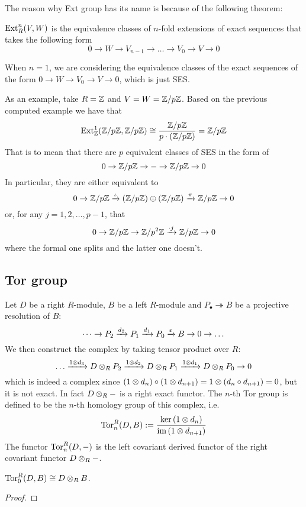 \begin{re}
    The reason why Ext group has its name is because of the following theorem:

    \medskip

    \begin{thm}
        $\operatorname{Ext}^n_R(V,W)$ is the equivalence classes of $n$-fold extensions of exact sequences that takes the following form 
        \[0 \to W \to V_{n-1}\to \dots \to V_0 \to V \to 0\]
    \end{thm}

    When $n=1$, we are considering the equivalence classes of the exact sequences of the form $0\to W \to V_0 \to V \to 0$, which is just SES.

    As an example, take $R={\mathbb Z}$ and $V=W = {\mathbb Z}/p{\mathbb Z}$. Based on the previous computed example we have that 
    \[\operatorname{Ext}_{\mathbb Z}^1({\mathbb Z}/p{\mathbb Z}, {\mathbb Z}/p{\mathbb Z}) \cong \frac{{\mathbb Z}/p{\mathbb Z}}{p\cdot ({\mathbb Z}/p{\mathbb Z})} = {\mathbb Z}/p{\mathbb Z}\]
    That is to mean that there are $p$ equivalent classes of SES in the form of 
    \[0 \to {\mathbb Z}/p{\mathbb Z} \to - \to {\mathbb Z}/p{\mathbb Z} \to 0\]
    In particular, they are either equivalent to 
    \[0 \to {\mathbb Z}/p{\mathbb Z} \xrightarrow{\iota} ({\mathbb Z}/p{\mathbb Z})\oplus ({\mathbb Z}/p{\mathbb Z}) \xrightarrow{\pi} {\mathbb Z}/p{\mathbb Z} \to 0\]
    or, for any $j=1,2, \dots, p-1$, that 
    \[0 \to {\mathbb Z}/p{\mathbb Z} \to {\mathbb Z}/p^2{\mathbb Z} \xrightarrow{\cdot j} {\mathbb Z}/p{\mathbb Z} \to 0\]
    where the formal one splits and the latter one doesn't.
\end{re}


\newpage
\subsection{Tor group}
\begin{defn} 
    Let $D$ be a right $R$-module, $B$ be a left $R$-module and $P_\bullet \twoheadrightarrow B$ be a projective resolution of $B$:
    \[\dots \to P_2\xrightarrow{d_2} P_1 \xrightarrow{d_1} P_0 \xrightarrow{\varepsilon} B \to 0 \to \dots\]
    We then construct the complex by taking tensor product over $R$:
    \[\dots \xrightarrow{1\otimes d_3} D\otimes_R P_2 \xrightarrow{1\otimes d_2} D\otimes_R P_1 \xrightarrow{1\otimes d_1} D\otimes_R P_0 \to 0\]
    which is indeed a complex since $(1\otimes d_n)\circ (1\otimes d_{n+1}) = 1\otimes (d_n\circ d_{n+1}) = 0$, but it is not exact. In fact $D\otimes_R -$ is a right exact functor. The $n$-th Tor group is defined to be the $n$-th homology group of this complex, i.e.
    \[\operatorname{Tor}_n^R(D,B) := \frac{\ker \left(1\otimes d_n\right)}{\operatorname{im} \left(1\otimes d_{n+1}\right)}\]
    The functor $\operatorname{Tor}_n^R(D, -)$ is the left covariant derived functor of the right covariant functor $D\otimes_R -$.
\end{defn}

\medskip

\begin{pro}
    $\operatorname{Tor}_0^R(D,B)\cong D\otimes_R B$.
\end{pro}
\begin{proof}
\end{proof}